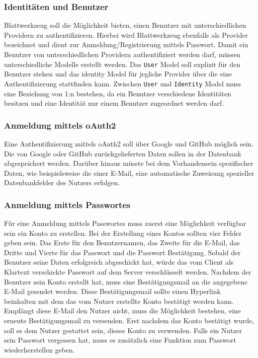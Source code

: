 \subsubsection{Identitäten und Benutzer}
\label{sec:identities_users}
Blattwerkzeug soll die Möglichkeit bieten, einen Benutzer mit unterschiedlichen Providern zu authentifizieren. Hierbei wird Blattwerkzeug ebenfalls als Provider bezeichnet und dient zur Anmeldung/Registrierung mittels Passwort. Damit ein Benutzer von unterschiedlichen Providern authentifiziert werden darf, müssen unterschiedliche Modelle erstellt werden. Das \texttt{User} Model soll explizit für den Benutzer stehen und das identity Model für jegliche Provider über die eine Authentifizierung stattfinden kann. Zwischen \texttt{User} und \texttt{Identity} Model muss eine Beziehung von 1:n bestehen, da ein Benutzer verschiedene Identitäten besitzen und eine Identität nur einem Benutzer zugeordnet werden darf.

\subsubsection{Anmeldung mittels \gls{oAuth2}}
Eine Authentifizierung mittels oAuth2 soll über Google und GitHub möglich sein. Die von Google oder GitHub zurückgelieferten Daten sollen in der Datenbank abgespeichert werden. Darüber hinaus müsste bei dem Vorhandensein spezifischer Daten, wie beispielsweise die einer E-Mail, eine automatische Zuweisung spezieller Datenbankfelder des Nutzers erfolgen.

\subsubsection{Anmeldung mittels Passwortes}
Für eine Anmeldung mittels Passwortes muss zuerst eine Möglichkeit verfügbar sein ein Konto zu erstellen. Bei der Erstellung eines Kontos sollten vier Felder geben sein. Das Erste für den Benutzernamen, das Zweite für die E-Mail, das Dritte und Vierte für das Passwort und die Passwort Bestätigung. Sobald der Benutzer seine Daten erfolgreich abgeschickt hat, würde das vom Client als Klartext verschickte Passwort auf dem Server verschlüsselt werden. Nachdem der Benutzer sein Konto erstellt hat, muss eine Bestätigungsmail an die angegebene E-Mail gesendet werden. Diese Bestätigungsmail sollte einen Hyperlink beinhalten mit dem das vom Nutzer erstellte Konto bestätigt werden kann. Empfängt diese E-Mail den Nutzer nicht, muss die Möglichkeit bestehen, eine erneute Bestätigungsmail zu versenden. Erst nachdem das Konto bestätigt wurde, soll es dem Nutzer gestattet sein, dieses Konto zu verwenden. Falls ein Nutzer sein Passwort vergessen hat, muss es zusätzlich eine Funktion zum Passwort wiederherstellen geben.

